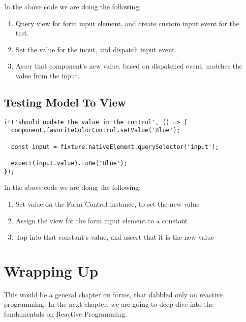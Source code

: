 In the above code we are doing the following: 
\begin{enumerate}
  \item Query view for form input element, and create custom input event for the test.
  \item Set the value for the inout, and dispatch input event.
  \item Asser that component's new value, based on dispatched event, matches the value from the input. 
\end{enumerate}

\subsection{ Testing Model To View }

\begin{lstlisting}
it('should update the value in the control', () => {
  component.favoriteColorControl.setValue('Blue');

  const input = fixture.nativeElement.querySelector('input');

  expect(input.value).toBe('Blue');
});
\end{lstlisting}

In the above code we are doing the following: 
\begin{enumerate}
  \item Set value on the Form Control instance, to set the new value 
  \item Assign the view for the form input element to a constant
  \item Tap into that constant's value, and assert that it is the new value
\end{enumerate}

\section{ Wrapping Up }
This would be a general chapter on forms, that dabbled only on reactive programming. In the next chapter, we are going to deep dive into the fundamentals on Reactive Programming. 

